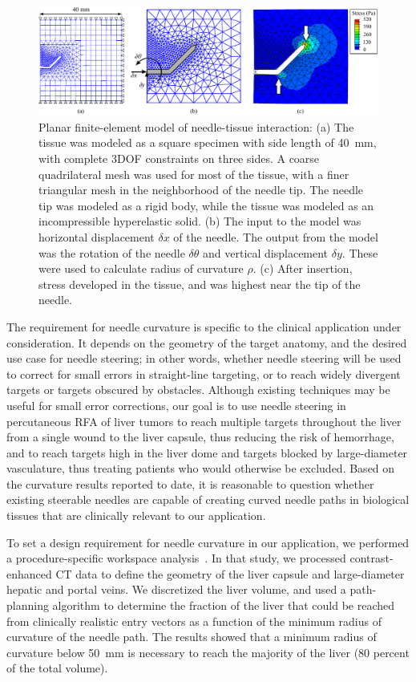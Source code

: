\begin{figure}[!t]
\centering
\includegraphics[width = \textwidth]{Images/Chapter3/Abaqus/Abaqus}%
\caption[Planar finite-element model of needle-tissue interaction]{Planar finite-element model of needle-tissue interaction: (a) The tissue was modeled as a square specimen with side length of 40~mm, with complete 3DOF constraints on three sides. A coarse quadrilateral mesh was used for most of the tissue, with a finer triangular mesh in the neighborhood of the needle tip. The needle tip was modeled as a rigid body, while the tissue was modeled as an incompressible hyperelastic solid. (b) The input to the model was horizontal displacement $\delta x$ of the needle. The output from the model was the rotation of the needle $\delta\theta$ and vertical displacement $\delta y$. These were used to calculate radius of curvature $\rho$. (c) After insertion, stress developed in the tissue, and was highest near the tip of the needle.}
\label{fig:Abaqus}
\end{figure}

The requirement for needle curvature is specific to the clinical application under consideration. It depends on the geometry of the target anatomy, and the desired use case for needle steering; in other words, whether needle steering will be used to correct for small errors in straight-line targeting, or to reach widely divergent targets or targets obscured by obstacles. Although existing techniques may be useful for small error corrections, our goal is to use needle steering in percutaneous RFA of liver tumors to reach multiple targets throughout the liver from a single wound to the liver capsule, thus reducing the risk of hemorrhage, and to reach targets high in the liver dome and targets blocked by large-diameter vasculature, thus treating patients who would otherwise be excluded. Based on the curvature results reported to date, it is reasonable to question whether existing steerable needles are capable of creating curved needle paths in biological tissues that are clinically relevant to our application.

To set a design requirement for needle curvature in our application, we performed a procedure-specific workspace analysis~\cite{Adebar2015}. In that study, we processed contrast-enhanced CT data to define the geometry of the liver capsule and large-diameter hepatic and portal veins. We discretized the liver volume, and used a path-planning algorithm to determine the fraction of the liver that could be reached from clinically realistic entry vectors as a function of the minimum radius of curvature of the needle path. The results showed that a minimum radius of curvature below 50~mm is necessary to reach the majority of the liver (80 percent of the total volume).

